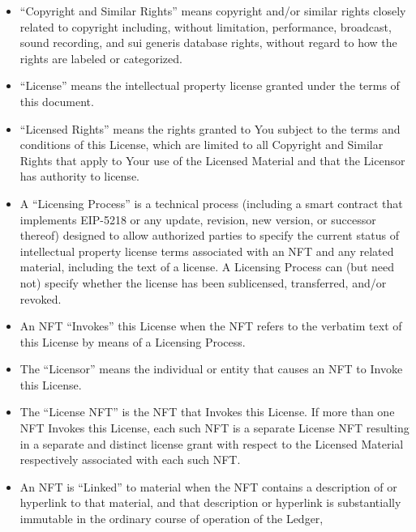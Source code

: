 \documentclass{article}
\newcommand{\eiplicense}{EIP-5218\xspace}
\newcommand{\subsect}[1]{\vspace{12pt}\noindent{\em{#1}}}
\begin{document}
\begin{sffamily}
	\subsect{Licensing}

	\begin{itemize}	
	\item	``Copyright and Similar Rights'' means copyright and/or similar rights closely related to copyright including, without limitation, performance, broadcast, sound recording, and sui generis database rights, without regard to how the rights are labeled or categorized.

	\item	``License'' means the intellectual property license granted under the terms of this document.
		
	\item	``Licensed Rights'' means the rights granted to You subject to the terms and conditions of this License, which are limited to all Copyright and Similar Rights that apply to Your use of the Licensed Material and that the Licensor has authority to license.

	\item	A ``Licensing Process'' is a technical process (including a smart contract that implements \eiplicense or any update, revision, new version, or successor thereof) designed to allow authorized parties to specify the current status of intellectual property license terms associated with an NFT and any related material, including the text of a license. A Licensing Process can (but need not) specify whether the license has been sublicensed, transferred, and/or revoked.

	\item	An NFT ``Invokes'' this License when the NFT refers to the verbatim text of this License by means of a Licensing Process.
		
	\item	The ``Licensor'' means the individual or entity that causes an NFT to Invoke this License.
		
	\item	The ``License NFT'' is the NFT that Invokes this License. If more than one NFT Invokes this License, each such NFT is a separate License NFT resulting in a separate and distinct license grant with respect to the Licensed Material respectively associated with each such NFT.
		
	\end{itemize}
		
	\subsect{Licensed and Adapted Material}

	\begin{itemize}
	
	\item	An NFT is ``Linked'' to material when the NFT contains a description of or hyperlink to that material, and that description or hyperlink is substantially immutable in the ordinary course of operation of the Ledger, 


\end{itemize}
\end{sffamily}
\end{document}
